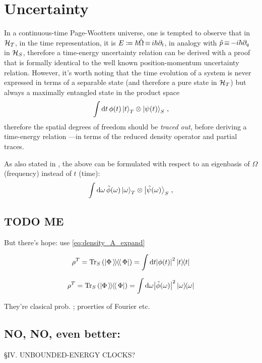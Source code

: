 \section{Uncertainty}

In a continuous-time Page-Wootters universe,
one is tempted to observe that in $\mathcal{H}_T$,
in the time representation, it is $E \coloneqq \hbar\hat{\Omega} \operatorname*{\equiv} i\hbar\partial_{t}$,
in analogy with $\hat{p} \operatorname*{\equiv} -i\hbar\partial_{q}$ in $\mathcal{H}_S$,
therefore a time-energy uncertainty relation can be derived
with a proof that is formally identical to the well known
position-momentum uncertainty relation. However, it's worth
noting that the time evolution of a system is never expressed
in terms of a separable state (and therefore a pure state in $\mathcal{H}_T$)
but always a maximally entangled state in the product space
\begin{equation}
  \int \dd t \, \phi(t) \ket{t}_T \otimes \ket{\psi(t)}_S \, \text{,}
\end{equation}
therefore the spatial degrees of freedom should be \emph{traced out},
before deriving a time-energy relation 
---in terms of the reduced density operator and partial traces.

As also stated in \cite{Lloyd:Time},
the above can be formulated with respect to an eigenbasis of $\Omega$ (frequency)
instead of $t$ (time):
\begin{equation}
  \int \dd \omega \, \tilde{\phi}(\omega) \ket{\omega}_T \otimes \ket{\tilde{\psi}(\omega)}_S \, \text{,}
\end{equation}


\subsection{TODO ME}

But there's hope: use \eqref{eq:density_A_expand}

\[
  \rho^T = \Tr_S\qty(\left| \Phi \left\rangle\hspace{-0.115em}\left\rangle \hspace{-0.115em} \right\langle\hspace{-0.115em}\right\langle \Phi \right|) = \int \dd t \abs{\phi(t)}^2 \ketbra{t}{t} 
\]

\[
  \rho^T = \Tr_S\qty(\left| \Phi \left\rangle\hspace{-0.115em}\left\rangle \hspace{-0.115em} \right\langle\hspace{-0.115em}\right\langle \Phi \right|) = \int \dd \omega \abs{\tilde{\phi}(\omega)}^2 \ketbra{\omega}{\omega} 
\]

They're clasical prob. ; proerties of Fourier etc.

\subsection{NO, NO, even better:}
\cite{Maccone:Pauli} \S IV.  UNBOUNDED-ENERGY CLOCKS?